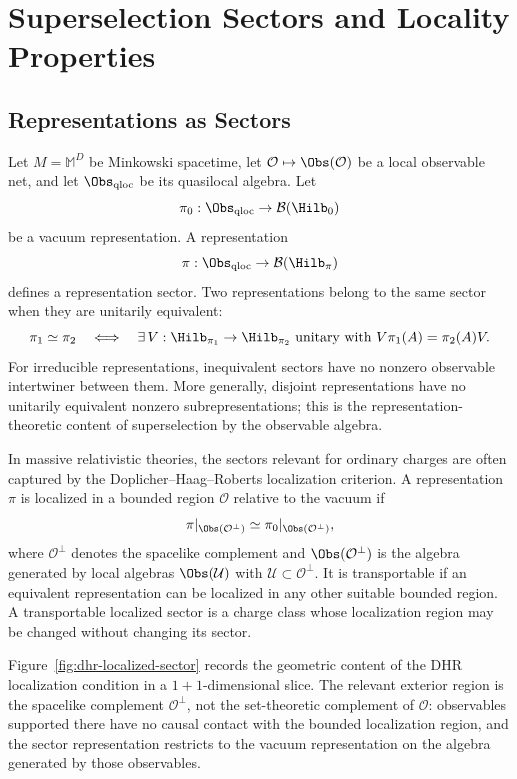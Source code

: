 \chapter{Superselection Sectors and Locality Properties}
\label{ch:volume-iv-superselection-sectors-locality-properties}
\ConventionsLorentzian


\section{Representations as Sectors}

Let \(M=\mathbb M^D\) be Minkowski spacetime, let
\(\mathcal O\mapsto\Obs(\mathcal O)\) be a local observable net, and let
\(\Obs_{\rm qloc}\) be its quasilocal algebra.  Let
\[
  \pi_0:\Obs_{\rm qloc}\to \mathcal B(\Hilb_0)
\]
be a vacuum representation.  A representation
\[
  \pi:\Obs_{\rm qloc}\to \mathcal B(\Hilb_\pi)
\]
defines a representation sector.  Two representations belong to the same
sector when they are unitarily equivalent:
\[
  \pi_1\simeq\pi_2
  \quad\Longleftrightarrow\quad
  \exists\,V:\Hilb_{\pi_1}\to\Hilb_{\pi_2}
  \text{ unitary with }V\pi_1(A)=\pi_2(A)V .
\]
For irreducible representations, inequivalent sectors have no nonzero
observable intertwiner between them.  More generally, disjoint
representations have no unitarily equivalent nonzero subrepresentations; this
is the representation-theoretic content of superselection by the observable
algebra.

In massive relativistic theories, the sectors relevant for ordinary charges
are often captured by the Doplicher--Haag--Roberts localization criterion.  A
representation \(\pi\) is localized in a bounded region \(\mathcal O\) relative to the
vacuum if
\begin{equation}
  \pi|_{\Obs(\mathcal O^\perp)}
  \simeq
  \pi_0|_{\Obs(\mathcal O^\perp)} ,
  \label{eq:dhr-localization}
\end{equation}
where \(\mathcal O^\perp\) denotes the spacelike complement and
\(\Obs(\mathcal O^\perp)\) is the algebra generated by local algebras
\(\Obs(\mathcal U)\) with \(\mathcal U\subset\mathcal O^\perp\).  It is
transportable if an equivalent representation can be localized in any other
suitable bounded region.  A transportable localized sector is a charge class
whose localization region may be changed without changing its sector.

Figure~\ref{fig:dhr-localized-sector} records the geometric content of the DHR
localization condition in a \(1+1\)-dimensional slice.  The relevant exterior
region is the spacelike complement \(\mathcal O^\perp\), not the set-theoretic
complement of \(\mathcal O\): observables supported there have no causal
contact with the bounded localization region, and the sector representation
restricts to the vacuum representation on the algebra generated by those
observables.

